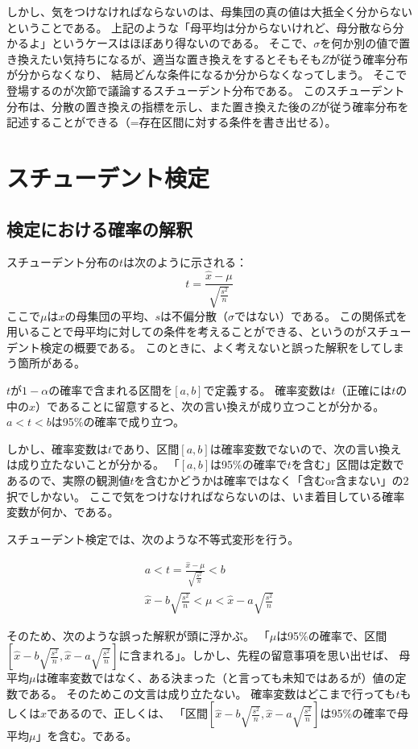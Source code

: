 しかし、気をつけなければならないのは、母集団の真の値は大抵全く分からないということである。
上記のような「母平均は分からないけれど、母分散なら分かるよ」というケースはほぼあり得ないのである。
そこで、$\sigma$を何か別の値で置き換えたい気持ちになるが、適当な置き換えをするとそもそも$Z$が従う確率分布が分からなくなり、
結局どんな条件になるか分からなくなってしまう。
そこで登場するのが次節で議論するスチューデント分布である。
このスチューデント分布は、分散の置き換えの指標を示し、また置き換えた後の$Z$が従う確率分布を記述することができる（=存在区間に対する条件を書き出せる）。


\section{スチューデント検定}

\subsection{検定における確率の解釈}

スチューデント分布の$t$は次のように示される：
\begin{equation}
  t = \frac{\hat{x}-\mu}{\sqrt{\frac{s^2}{n}}}
\end{equation}
ここで$\mu$は$x$の母集団の平均、$s$は不偏分散（$\sigma$ではない）である。
この関係式を用いることで母平均に対しての条件を考えることができる、というのがスチューデント検定の概要である。
このときに、よく考えないと誤った解釈をしてしまう箇所がある。

$t$が$1-\alpha$の確率で含まれる区間を$[a, b]$で定義する。
確率変数は$t$（正確には$t$の中の$x$）であることに留意すると、次の言い換えが成り立つことが分かる。
$a<t<b$は95\%の確率で成り立つ。

しかし、確率変数は$t$であり、区間$[a,b]$は確率変数でないので、次の言い換えは成り立たないことが分かる。
「$[a,b]$は95\%の確率で$t$を含む」区間は定数であるので、実際の観測値$t$を含むかどうかは確率ではなく「含むor含まない」の2択でしかない。
ここで気をつけなければならないのは、いま着目している確率変数が何か、である。

スチューデント検定では、次のような不等式変形を行う。

\begin{eqnarray}
  a < t = \frac{\hat{x}-\mu}{\sqrt{\frac{s^2}{n}}} < b \\
  \hat{x} - b \sqrt{\frac{s^2}{n}} < \mu < \hat{x} - a \sqrt{\frac{s^2}{n}}
\end{eqnarray}

そのため、次のような誤った解釈が頭に浮かぶ。
「$\mu$は95\%の確率で、区間$[\hat{x} - b \sqrt{\frac{s^2}{n}}, \hat{x} - a \sqrt{\frac{s^2}{n}}]$に含まれる」。しかし、先程の留意事項を思い出せば、
母平均$\mu$は確率変数ではなく、ある決まった（と言っても未知ではあるが）値の定数である。
そのためこの文言は成り立たない。
確率変数はどこまで行っても$t$もしくは$\hat{x}$であるので、正しくは、
「区間$[\hat{x} - b \sqrt{\frac{s^2}{n}}, \hat{x} - a \sqrt{\frac{s^2}{n}}]$は95\%の確率で母平均$\mu$」を含む。である。











